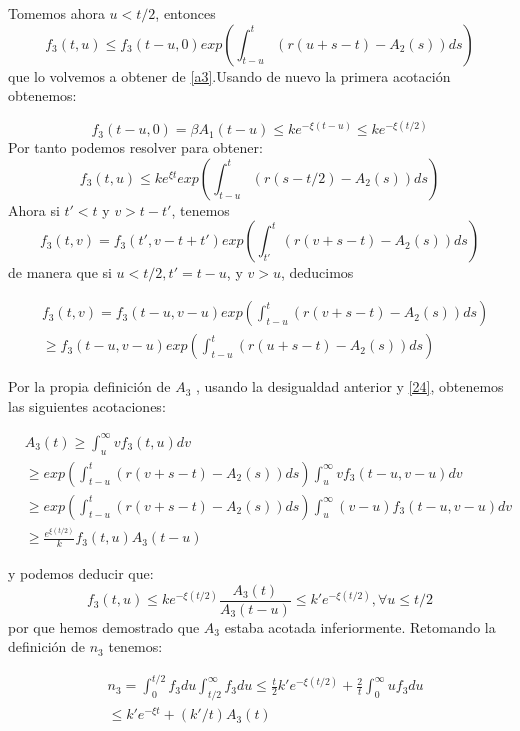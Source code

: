 \documentclass[1p]{elsarticle}
\begin{document}
Tomemos ahora  $u<t / 2$, entonces 
$$f_3(t,u)\leq f_3(t-u,0)exp(\int_{t-u}^{t}(r(u+s-t)-A_2(s))ds)$$
que lo volvemos a obtener de \ref{a3}.Usando de nuevo la primera acotación obtenemos:

$$f_3 (t -u, 0) = \beta A_1 (t -u)\leq ke^{ - \xi (t-u)} \leq ke^{ - \xi (t/2)}$$
Por tanto podemos resolver para obtener:
\begin{equation}f_3(t,u)\leq ke^{\xi t}exp(\int_{t-u}^{t}(r(s-t/2)-A_2(s))ds)
\label{24}
\end{equation}
Ahora si $t'<t$ y $v>t -t'$, tenemos
$$f_3 (t, v) = f_3 (t', v -t +t') exp(\int_{t'}^{t}(r(v+s-t)-A_2(s))ds)$$
de manera que si  $u<t / 2, t' = t -u$, y $v>u$, deducimos


\begin{equation}
\begin{split}
&f_3 (t, v) = f_3 (t-u,v-u) exp(\int_{t-u}^{t}(r(v+s-t)-A_2(s))ds)\\
&\geq f_3 (t-u,v-u) exp(\int_{t-u}^{t}(r(u+s-t)-A_2(s))ds)
\end{split} 
\end{equation}

Por la propia definición de $A_3$ , usando la desigualdad anterior  y \ref{24}, obtenemos las siguientes acotaciones:

\begin{equation}
\begin{split}
&A_3(t)\geq \int_{u}^{\infty}vf_3(t,u)dv\\
&\geq exp(\int_{t-u}^{t}(r(v+s-t)-A_2(s))ds)\int_{u}^{\infty}vf_3(t-u,v-u)dv\\
&\geq exp(\int_{t-u}^{t}(r(v+s-t)-A_2(s))ds)\int_{u}^{\infty}(v-u)f_3(t-u,v-u)dv\\
&\geq\frac{e^{\xi(t/2)}}{k}f_3(t,u)A_3(t-u)
\end{split} 
\end{equation}



y podemos deducir que:
\begin{equation}f_3 (t, u)\leq ke^{- \xi(t/2)}\frac{A_3 (t)}{A_3(t-u)}\leq k'e^{- \xi(t/2)}, \forall u\leq t/2
\label{25}
\end{equation}
por que hemos demostrado que $A_3$ estaba acotada inferiormente.
Retomando la definición de $n_3$ tenemos:

\begin{equation}
\begin{split}
&n_3=\int_{0}^{t/2}f_3du\int_{t/2}^{\infty}f_3du\leq\frac{t}{2}k'e^{-\xi(t/2)}+\frac{2}{t}\int_{0}^{\infty}uf_3du\\
&\leq k'e^{-\xi t}+(k'/t)A_3(t)
\end{split} 
\end{equation}
\end{document}

